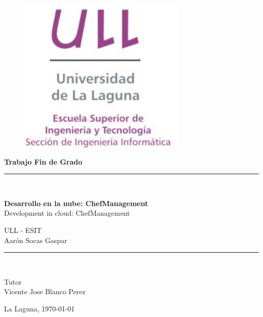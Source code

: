 \documentclass[spanish,a4paper,14pt,twoside]{report}
\begin{document}
\begin{titlepage}

  \begin{center}
    \vspace*{-1in}
    \begin{figure}[htb]
      \begin{center}
        \includegraphics[width=8cm]{./images/logotipo-secundario-ULL-ESIT.jpg}
      \end{center}
    \end{figure}

    \begin{Large}
      \textbf{{\huge Trabajo Fin de Grado}}
    \end{Large}
    \rule{80mm}{0.3mm}\\
  \end{center}

  \begin{center}
    \vspace*{0.2in}
    \begin{LARGE}
      \textbf{Desarrollo en la nube: ChefManagement} \\
      Development in cloud: ChefManagement \\
    \end{LARGE}

    \vspace*{0.2in}
    \begin{large}
      ULL - ESIT\\
      {Aarón Socas Gaspar}\\
    \end{large}
    \vspace*{0.3in}
    \rule{80mm}{0.1mm}\\
    
    \vspace*{0.1in}
    \begin{large}
      Tutor \\
      Vicente Jose Blanco Perez \\
    \end{large}
    \vspace*{0.3in}
    \Large La Laguna, \today \\
  \end{center}

\end{titlepage}
\end{document}
